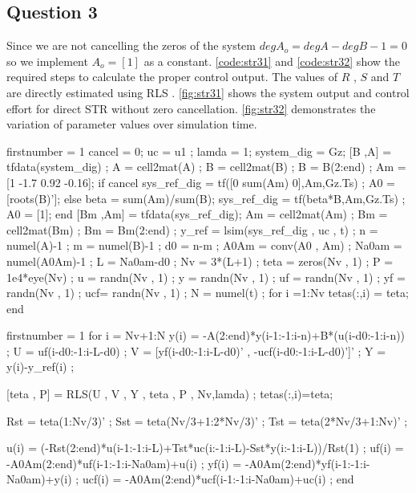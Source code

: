 \FloatBarrier
\subsection{Question 3}
Since we are not cancelling the zeros of the system $degA_o = degA-degB-1=0$ so we implement  $A_o =  [1]$ as a constant.
\autoref{code:str31} and \autoref{code:str32} show the required steps to calculate the proper control output. The values of $R$ , $S$ and $T$ are directly estimated using RLS . \autoref{fig:str31} shows the system output and control effort for direct STR without zero cancellation.  \autoref{fig:str32} demonstrates the variation of parameter values over simulation time.

\begin{code}
	\begin{matlabcode}{firstnumber = 1}
	cancel = 0; %
	uc = u1 ;
	lamda = 1;
	system_dig = Gz; %
	[B  ,A] = tfdata(system_dig) ;
	A = cell2mat(A) ;
	B = cell2mat(B) ; B = B(2:end) ;
	Am = [1 -1.7 0.92 -0.16];
	if cancel
		sys_ref_dig = tf([0 sum(Am) 0],Am,Gz.Ts) ;
		A0 = [roots(B)'];
	else
		beta = sum(Am)/sum(B);
		sys_ref_dig = tf(beta*B,Am,Gz.Ts) ;
		A0 = [1];
	end
	[Bm  ,Am] = tfdata(sys_ref_dig);
	Am = cell2mat(Am) ;
	Bm = cell2mat(Bm) ; Bm = Bm(2:end) ;
	y_ref = lsim(sys_ref_dig , uc , t) ;
	n = numel(A)-1 ;
	m = numel(B)-1 ;
	d0 = n-m ;
	A0Am = conv(A0 , Am) ;
	Na0am = numel(A0Am)-1 ;
	L = Na0am-d0 ;
	Nv = 3*(L+1) ;
	teta = zeros(Nv , 1) ;
	P = 1e4*eye(Nv) ;
	u  = randn(Nv , 1) ;  %
	y  = randn(Nv , 1) ;  %
	uf = randn(Nv , 1) ;  %
	yf = randn(Nv , 1) ;  %
	ucf= randn(Nv , 1) ;  %
	N = numel(t) ;
	for i =1:Nv
		tetas(:,i) = teta;
	end
		\end{matlabcode}
	\label{code:str31}
\end{code}
	\begin{code}
		\begin{matlabcode}{firstnumber = 1}
	for i = Nv+1:N
		y(i) = -A(2:end)*y(i-1:-1:i-n)+B*(u(i-d0:-1:i-n)) ;
		U = uf(i-d0:-1:i-L-d0) ;
		V = [yf(i-d0:-1:i-L-d0)' , -ucf(i-d0:-1:i-L-d0)']' ;
		Y = y(i)-y_ref(i) ;
		
		[teta , P] = RLS(U , V , Y , teta , P , Nv,lamda) ;
		tetas(:,i)=teta;
		
		Rst = teta(1:Nv/3)' ;
		Sst = teta(Nv/3+1:2*Nv/3)' ;
		Tst = teta(2*Nv/3+1:Nv)' ;
		
		u(i) = (-Rst(2:end)*u(i-1:-1:i-L)+Tst*uc(i:-1:i-L)-Sst*y(i:-1:i-L))/Rst(1) ;
		uf(i) = -A0Am(2:end)*uf(i-1:-1:i-Na0am)+u(i) ;
		yf(i) = -A0Am(2:end)*yf(i-1:-1:i-Na0am)+y(i) ;
		ucf(i) = -A0Am(2:end)*ucf(i-1:-1:i-Na0am)+uc(i) ;
	end
	\end{matlabcode}
	\label{code:str32}
\end{code}

